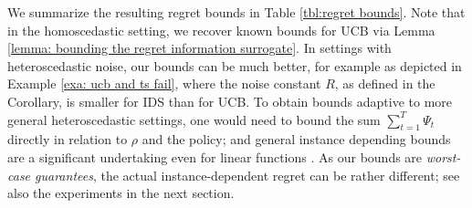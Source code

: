 We summarize the resulting regret bounds in Table \ref{tbl:regret bounds}. Note that in the homoscedastic setting, we recover known bounds for UCB via Lemma \ref{lemma: bounding the regret information surrogate}. In settings with heteroscedastic noise, our bounds can be much better, for example as depicted in Example \ref{exa: ucb and ts fail}, where the noise constant $R$, as defined in the Corollary, is smaller for IDS than for UCB. To obtain bounds adaptive to more general heteroscedastic settings, one would need to bound the sum $\sum_{t=1}^T \Psi_t$ directly in relation to $\rho$ and the policy; and general instance depending bounds are a significant undertaking even for linear functions \citep{LattimoreEndOptimismAsymptotic2017}. As our bounds are \emph{worst-case guarantees}, the actual instance-dependent regret can be rather different; see also the experiments in the next section. 




